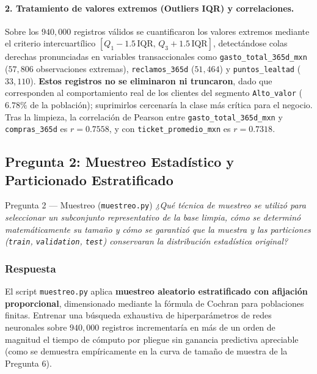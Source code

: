 \documentclass[11pt,a4paper]{article}
\newcommand{\code}[1]{\texttt{\small #1}}
\begin{document}
\paragraph{2. Tratamiento de valores extremos (Outliers IQR) y correlaciones.}
Sobre los $940{,}000$ registros válidos se cuantificaron los valores extremos mediante el criterio intercuartílico $[Q_1 - 1.5\,\text{IQR},\, Q_3 + 1.5\,\text{IQR}]$, detectándose colas derechas pronunciadas en variables transaccionales como \code{gasto\_total\_365d\_mxn} ($57{,}806$ observaciones extremas), \code{reclamos\_365d} ($51{,}464$) y \code{puntos\_lealtad} ($33{,}110$). \textbf{Estos registros no se eliminaron ni truncaron}, dado que corresponden al comportamiento real de los clientes del segmento \code{Alto\_valor} ($6.78\%$ de la población); suprimirlos cercenaría la clase más crítica para el negocio. Tras la limpieza, la correlación de Pearson entre \code{gasto\_total\_365d\_mxn} y \code{compras\_365d} es $r = 0.7558$, y con \code{ticket\_promedio\_mxn} es $r = 0.7318$.

\subsection{Pregunta 2: Muestreo Estadístico y Particionado Estratificado}

\begin{pregunta}{Pregunta 2 --- Muestreo (\texttt{muestreo.py})}{}
\textit{¿Qué técnica de muestreo se utilizó para seleccionar un subconjunto representativo de la base limpia, cómo se determinó matemáticamente su tamaño y cómo se garantizó que la muestra y las particiones (\texttt{train}, \texttt{validation}, \texttt{test}) conservaran la distribución estadística original?}
\end{pregunta}

\subsubsection*{Respuesta}

El script \code{muestreo.py} aplica \textbf{muestreo aleatorio estratificado con afijación proporcional}, dimensionado mediante la fórmula de Cochran para poblaciones finitas. Entrenar una búsqueda exhaustiva de hiperparámetros de redes neuronales sobre $940{,}000$ registros incrementaría en más de un orden de magnitud el tiempo de cómputo por pliegue sin ganancia predictiva apreciable (como se demuestra empíricamente en la curva de tamaño de muestra de la Pregunta 6).
\end{document}
